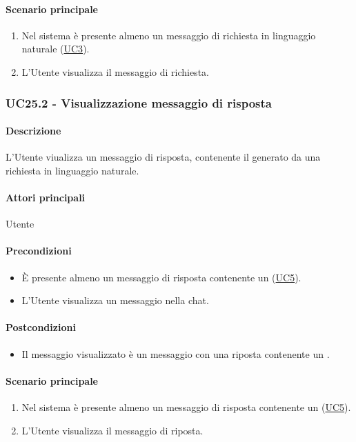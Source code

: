 \paragraph*{Scenario principale}
\begin{enumerate}
  \item Nel sistema è presente almeno un messaggio di richiesta in linguaggio naturale (\hyperref[UC3]{UC3}).
  \item L'Utente visualizza il messaggio di richiesta.
\end{enumerate}


\subsubsection{UC25.2 - Visualizzazione messaggio di risposta}\label{UC25point2}
\paragraph*{Descrizione}
L'Utente viualizza un messaggio di risposta, contenente il  generato da una richiesta in linguaggio naturale.

\paragraph*{Attori principali}
Utente

\paragraph*{Precondizioni}
\begin{itemize}
  \item È presente almeno un messaggio di risposta contenente un  (\hyperref[UC5]{UC5}).
  \item L'Utente visualizza un messaggio nella chat.
\end{itemize}

\paragraph*{Postcondizioni}
\begin{itemize}
  \item Il messaggio visualizzato è un messaggio con una riposta contenente un .
\end{itemize}

\paragraph*{Scenario principale}
\begin{enumerate}
  \item Nel sistema è presente almeno un messaggio di risposta contenente un  (\hyperref[UC5]{UC5}).
  \item L'Utente visualizza il messaggio di riposta.
\end{enumerate}

